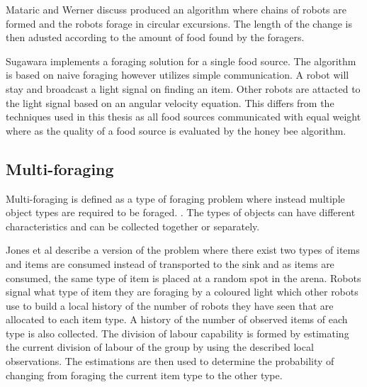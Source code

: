 Mataric \cite{werger1996robotic} and Werner discuss produced an algorithm where chains of robots are formed and the robots forage in circular excursions. The length of the change is then adusted according to the amount of food found by the foragers. %
 
Sugawara \cite{sugawara2002swarming} implements a foraging solution for a single food source. The algorithm is based on naive foraging however utilizes simple communication. A robot will stay and broadcast a light signal on finding an item. Other robots are attacted to the light signal based on an angular velocity equation. This differs from the techniques used in this thesis as all food sources communicated with equal weight where as the quality of a food source is evaluated by the honey bee algorithm.

\subsection{Multi-foraging}
\label{multiforaging}
Multi-foraging is defined as a type of foraging problem where instead multiple object types are required to be foraged. \cite{Balch99rewardand}. The types of objects can have different characteristics and can be collected together or separately.

Jones et al \cite{jones2003adaptive} describe a version of the problem where there exist two types of items and items are consumed instead of transported to the sink and as items are consumed, the same type of item is placed at a random spot in the arena. Robots signal what type of item they are foraging by a coloured light which other robots use to build a local history of the number of robots they have seen that are allocated to each item type. A history of the number of observed items of each type is also collected. The division of labour capability is formed by estimating the current division of labour of the group by  using the described local observations. The estimations are then used to determine the probability of changing from foraging the current item type to the other type. 


